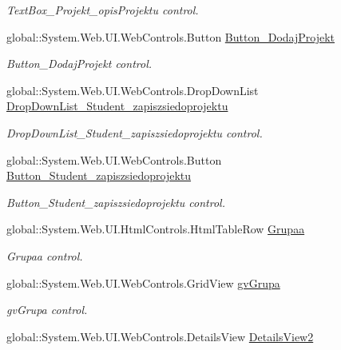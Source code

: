 \begin{DoxyCompactItemize}
\begin{DoxyCompactList}\small\item\em Text\+Box\+\_\+\+Projekt\+\_\+opis\+Projektu control. \end{DoxyCompactList}\item 
global\+::\+System.\+Web.\+U\+I.\+Web\+Controls.\+Button \hyperlink{class_dziennik_ocen_web2_1_1_web_form1_a9fce9205408b95c8ca305b3c235032d1}{Button\+\_\+\+Dodaj\+Projekt}
\begin{DoxyCompactList}\small\item\em Button\+\_\+\+Dodaj\+Projekt control. \end{DoxyCompactList}\item 
global\+::\+System.\+Web.\+U\+I.\+Web\+Controls.\+Drop\+Down\+List \hyperlink{class_dziennik_ocen_web2_1_1_web_form1_a4f4cb6542c912f6973422fe6db30d233}{Drop\+Down\+List\+\_\+\+Student\+\_\+zapiszsiedoprojektu}
\begin{DoxyCompactList}\small\item\em Drop\+Down\+List\+\_\+\+Student\+\_\+zapiszsiedoprojektu control. \end{DoxyCompactList}\item 
global\+::\+System.\+Web.\+U\+I.\+Web\+Controls.\+Button \hyperlink{class_dziennik_ocen_web2_1_1_web_form1_aa90a53487f082ae6c9124c782abd0678}{Button\+\_\+\+Student\+\_\+zapiszsiedoprojektu}
\begin{DoxyCompactList}\small\item\em Button\+\_\+\+Student\+\_\+zapiszsiedoprojektu control. \end{DoxyCompactList}\item 
global\+::\+System.\+Web.\+U\+I.\+Html\+Controls.\+Html\+Table\+Row \hyperlink{class_dziennik_ocen_web2_1_1_web_form1_a60e5d184ead042ff03cec6a6f956f9ba}{Grupaa}
\begin{DoxyCompactList}\small\item\em Grupaa control. \end{DoxyCompactList}\item 
global\+::\+System.\+Web.\+U\+I.\+Web\+Controls.\+Grid\+View \hyperlink{class_dziennik_ocen_web2_1_1_web_form1_a0c2630436cb78a1aa9de889b4961ea4f}{gv\+Grupa}
\begin{DoxyCompactList}\small\item\em gv\+Grupa control. \end{DoxyCompactList}\item 
global\+::\+System.\+Web.\+U\+I.\+Web\+Controls.\+Details\+View \hyperlink{class_dziennik_ocen_web2_1_1_web_form1_ac5d39d20de2956bae8ae9c23e148375f}{Details\+View2}

\end{DoxyCompactItemize}
